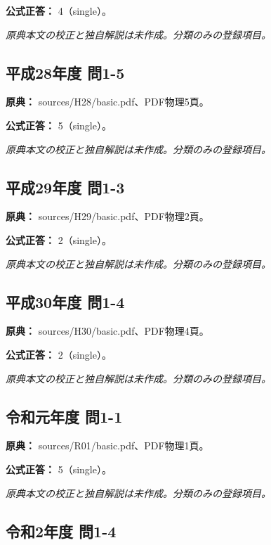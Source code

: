 \textbf{公式正答：} 4（single）。

\par\textit{原典本文の校正と独自解説は未作成。分類のみの登録項目。}

\subsection{平成28年度 問1-5}
\label{q:h28-reg-basic-1-5}

\noindent\textbf{原典：} sources/H28/basic.pdf、PDF物理5頁。

\textbf{公式正答：} 5（single）。

\par\textit{原典本文の校正と独自解説は未作成。分類のみの登録項目。}

\subsection{平成29年度 問1-3}
\label{q:h29-reg-basic-1-3}

\noindent\textbf{原典：} sources/H29/basic.pdf、PDF物理2頁。

\textbf{公式正答：} 2（single）。

\par\textit{原典本文の校正と独自解説は未作成。分類のみの登録項目。}

\subsection{平成30年度 問1-4}
\label{q:h30-reg-basic-1-4}

\noindent\textbf{原典：} sources/H30/basic.pdf、PDF物理4頁。

\textbf{公式正答：} 2（single）。

\par\textit{原典本文の校正と独自解説は未作成。分類のみの登録項目。}

\subsection{令和元年度 問1-1}
\label{q:r01-reg-basic-1-1}

\noindent\textbf{原典：} sources/R01/basic.pdf、PDF物理1頁。

\textbf{公式正答：} 5（single）。

\par\textit{原典本文の校正と独自解説は未作成。分類のみの登録項目。}

\subsection{令和2年度 問1-4}
\label{q:r02-reg-basic-1-4}

